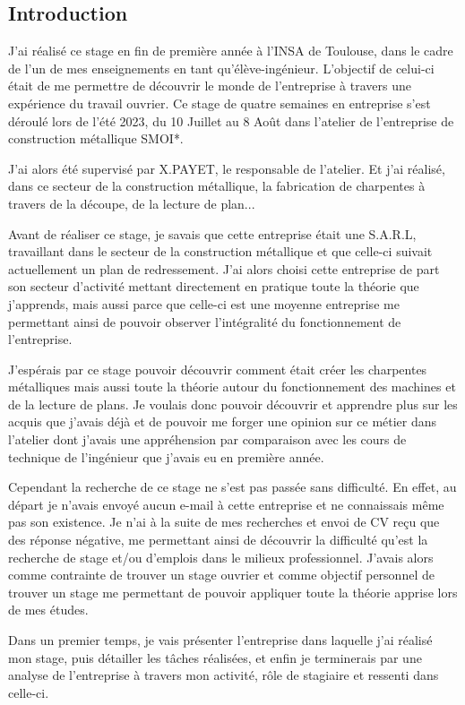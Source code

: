 \rhead{\nouppercase{\leftmark}}
\setcounter{secnumdepth}{0}
\begin{center}
    \section{Introduction}
\end{center}
J'ai réalisé ce stage en fin de première année à l'INSA de Toulouse, dans le cadre de l'un de mes enseignements en tant qu'élève-ingénieur. L'objectif de celui-ci était de me permettre de découvrir le monde de l'entreprise à travers une expérience du travail ouvrier. Ce stage de quatre semaines en entreprise s'est déroulé lors de l'été 2023, du 10 Juillet au 8 Août dans l'atelier de l'entreprise de construction métallique \acrshort{SMOI}*.\par

J'ai alors été supervisé par X.PAYET, le responsable de l'atelier. Et j'ai réalisé, dans ce secteur de la construction métallique, la fabrication de charpentes à travers de la découpe, de la lecture de plan...\newline

Avant de réaliser ce stage, je savais que cette entreprise était une S.A.R.L, travaillant dans le secteur de la construction métallique et que celle-ci suivait actuellement un plan de redressement. J'ai alors choisi cette entreprise de part son secteur d'activité mettant directement en pratique toute la théorie que j'apprends, mais aussi parce que celle-ci est une moyenne entreprise me permettant ainsi de pouvoir observer l'intégralité du fonctionnement de l'entreprise.\par

J'espérais par ce stage pouvoir découvrir comment était créer les charpentes métalliques mais aussi toute la théorie autour du fonctionnement des machines et de la lecture de plans. Je voulais donc pouvoir découvrir et apprendre plus sur les acquis que j'avais déjà et de pouvoir me forger une opinion sur ce métier dans l'atelier dont j'avais une appréhension par comparaison avec les cours de technique de l'ingénieur que j'avais eu en première année.\newline

Cependant la recherche de ce stage ne s'est pas passée sans difficulté. En effet, au départ je n'avais envoyé aucun e-mail à cette entreprise et ne connaissais même pas son existence. Je n'ai à la suite de mes recherches et envoi de CV reçu que des réponse négative, me permettant ainsi de découvrir la difficulté qu'est la recherche de stage et/ou d'emplois dans le milieux professionnel. J'avais alors comme contrainte de trouver un stage ouvrier et comme objectif personnel de trouver un stage me permettant de pouvoir appliquer toute la théorie apprise lors de mes études.\newline

Dans un premier temps, je vais présenter l'entreprise dans laquelle j'ai réalisé mon stage, puis détailler les tâches réalisées, et enfin je terminerais par une analyse de l'entreprise à travers mon activité, rôle de stagiaire et ressenti dans celle-ci.

 
